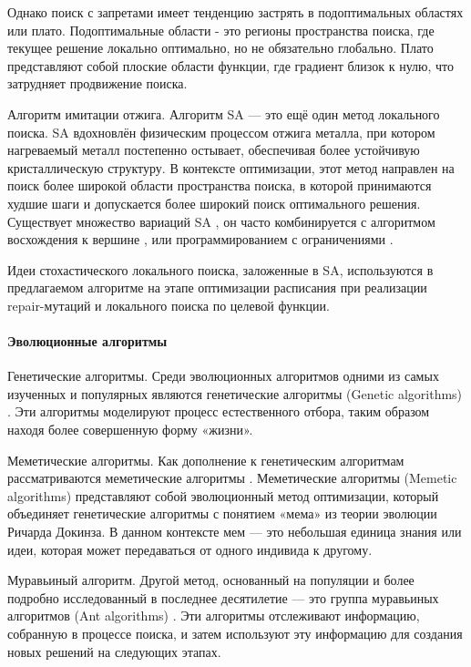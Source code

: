 Однако поиск с запретами имеет тенденцию застрять в подоптимальных областях или плато. Подоптимальные области - это регионы пространства поиска, где текущее решение локально оптимально, но не обязательно глобально. Плато представляют собой плоские области функции, где градиент близок к нулю, что затрудняет продвижение поиска.

Алгоритм имитации отжига. Алгоритм SA --- это ещё один метод локального поиска. SA вдохновлён физическим процессом отжига металла, при котором нагреваемый металл постепенно остывает, обеспечивая более устойчивую кристаллическую структуру. В контексте оптимизации, этот метод направлен на поиск более широкой области пространства поиска, в которой принимаются худшие шаги и допускается более широкий поиск оптимального решения. Существует множество вариаций SA \cite{burke:timepredefined,dowsland:simulatedannealing}, он часто комбинируется с алгоритмом восхождения к вершине \cite{qu:survey}, или программированием с ограничениями \cite{brailsford:csp}.

Идеи стохастического локального поиска, заложенные в SA, используются в предлагаемом алгоритме на этапе оптимизации расписания при реализации repair-мутаций и локального поиска по целевой функции.

\paragraph{Эволюционные алгоритмы}

Генетические алгоритмы. Среди эволюционных алгоритмов одними из самых изученных и популярных являются генетические алгоритмы (Genetic algorithms) \cite{corne:evolutionary}. Эти алгоритмы моделируют процесс естественного отбора, таким образом находя более совершенную форму «жизни».

Меметические алгоритмы. Как дополнение к генетическим алгоритмам рассматриваются меметические алгоритмы \cite{burke:memetic}. Меметические алгоритмы (Memetic algorithms) представляют собой эволюционный метод оптимизации, который объединяет генетические алгоритмы с понятием «мема» из теории эволюции Ричарда Докинза. В данном контексте мем --- это небольшая единица знания или идеи, которая может передаваться от одного индивида к другому.

Муравьиный алгоритм. Другой метод, основанный на популяции и более подробно исследованный в последнее десятилетие --- это группа муравьиных алгоритмов (Ant algorithms) \cite{dorigo:aco}. Эти алгоритмы отслеживают информацию, собранную в процессе поиска, и затем используют эту информацию для создания новых решений на следующих этапах.

